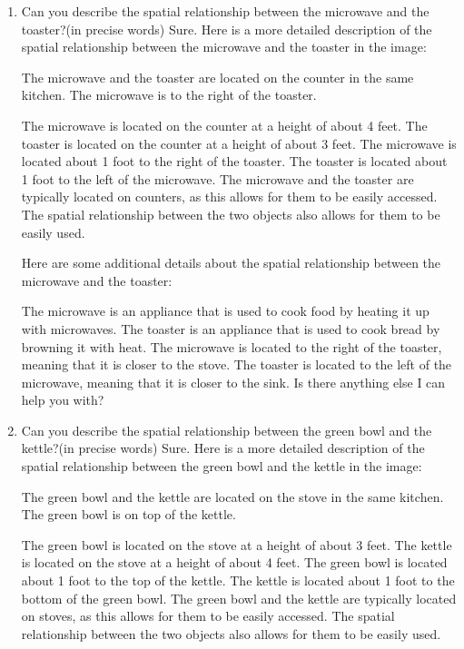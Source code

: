\begin{enumerate}
    \item Can you describe the spatial relationship between the microwave and the toaster?(in precise words)
    \subitem 
    Sure. Here is a more detailed description of the spatial relationship between the microwave and the toaster in the image:
    
    The microwave and the toaster are located on the counter in the same kitchen. The microwave is to the right of the toaster.
    
    The microwave is located on the counter at a height of about 4 feet.
    The toaster is located on the counter at a height of about 3 feet.
    The microwave is located about 1 foot to the right of the toaster.
    The toaster is located about 1 foot to the left of the microwave.
    The microwave and the toaster are typically located on counters, as this allows for them to be easily accessed. The spatial relationship between the two objects also allows for them to be easily used.
    
    Here are some additional details about the spatial relationship between the microwave and the toaster:
    
    The microwave is an appliance that is used to cook food by heating it up with microwaves.
    The toaster is an appliance that is used to cook bread by browning it with heat.
    The microwave is located to the right of the toaster, meaning that it is closer to the stove.
    The toaster is located to the left of the microwave, meaning that it is closer to the sink.
    Is there anything else I can help you with?
    \item Can you describe the spatial relationship between the green bowl and the kettle?(in precise words)
    \subitem 
    Sure. Here is a more detailed description of the spatial relationship between the green bowl and the kettle in the image:
    
    The green bowl and the kettle are located on the stove in the same kitchen. The green bowl is on top of the kettle.
    
    The green bowl is located on the stove at a height of about 3 feet.
    The kettle is located on the stove at a height of about 4 feet.
    The green bowl is located about 1 foot to the top of the kettle.
    The kettle is located about 1 foot to the bottom of the green bowl.
    The green bowl and the kettle are typically located on stoves, as this allows for them to be easily accessed. The spatial relationship between the two objects also allows for them to be easily used.
    

\end{enumerate}
